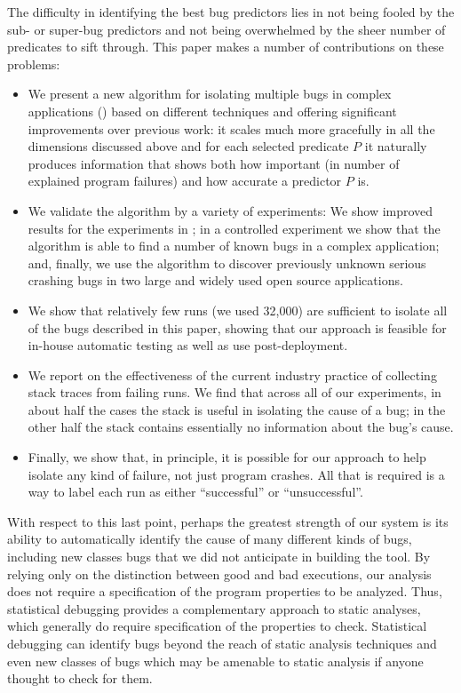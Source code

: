 \documentclass[draft]{sig-alternate}
\begin{document}
The difficulty in identifying the best bug predictors lies in not being
fooled by the sub- or super-bug predictors and not being overwhelmed
by the sheer number of predicates to sift through.
This paper makes a number of contributions on these problems:

\begin{itemize}

\item We present a new algorithm for isolating multiple bugs in
complex applications () based on different
techniques and offering significant improvements over previous work:
it scales much more gracefully in all the dimensions discussed above
and for each selected predicate $P$ it naturally produces information
that shows both how important (in number of explained program
failures) and how accurate a predictor $P$ is.

\item We validate the algorithm by a variety of experiments: We show
improved results for the experiments in \cite{PLDI`03*141}; in a
controlled experiment we show that the algorithm is able to find a
number of known bugs in a complex application; and, finally, we use
the algorithm to discover previously unknown serious crashing bugs in
two large and widely used open source applications.

\item We show that relatively few runs (we used 32,000) are sufficient
to isolate all of the bugs described in this paper, showing that our
approach is feasible for in-house automatic testing as well as use
post-deployment.

\item We report on the effectiveness of the current industry practice
of collecting stack traces from failing runs.  We find that across all
of our experiments, in about half the cases the stack is useful in
isolating the cause of a bug; in the other half the stack contains
essentially no information about the bug's cause.

\item Finally, we show that, in principle, it is possible for our
approach to help isolate any kind of failure, not just program
crashes.  All that is required is a way to label each run as either
``successful'' or ``unsuccessful''.

\end{itemize}

With respect to this last point, perhaps the greatest strength of our
system is its ability to automatically identify the cause of many
different kinds of bugs, including new classes bugs that we did not
anticipate in building the tool.  By relying only on the distinction
between good and bad executions, our analysis does not require a
specification of the program properties to be analyzed.  Thus,
statistical debugging provides a complementary approach to static
analyses, which generally do require specification of the properties
to check.  Statistical debugging can identify bugs beyond the reach of
static analysis techniques and even new classes of bugs which may be
amenable to static analysis if anyone thought to check for them.
\end{document}
